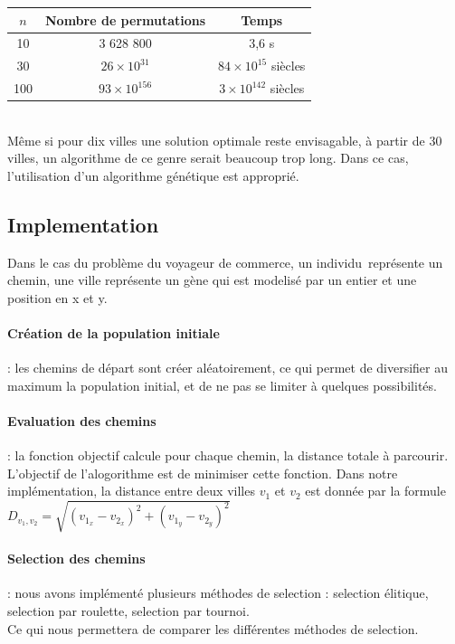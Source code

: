 \documentclass{article}
\begin{document}
	\begin{tabular}{ccc}
	\hline
	$n$ & Nombre de permutations & Temps \\
	\hline
	10 & 3 628 800 & 3,6 s\\
	30 & $26 \times 10^{31}$ & $84 \times 10^{15}$ siècles \\
	100 & $93 \times 10^{156}$ & $3 \times 10^{142}$ siècles \\
	\hline
	\end{tabular}
	\\
    Même si pour dix villes une solution optimale reste envisagable, à partir de 30 villes, un algorithme de ce genre serait beaucoup trop long.
	Dans ce cas, l'utilisation d'un algorithme génétique est approprié.

    \subsection{Implementation}

    Dans le cas du problème du voyageur de commerce, un individu représente un chemin, une ville représente un gène qui est modelisé par un entier et une position en x et y.

    \paragraph{Création de la population initiale}: les chemins de départ sont créer aléatoirement, ce qui permet de diversifier au maximum la population initial, et de ne pas se limiter à quelques possibilités.

    \paragraph{Evaluation des chemins}: la fonction objectif calcule pour chaque chemin, la distance totale à parcourir. L'objectif de l'alogorithme est de minimiser cette fonction. Dans notre implémentation, la distance entre deux villes $v_1$ et $v_2$ est donnée par la formule $D_{v_1, v_2} = \sqrt{(v_{1_x}-v_{2_x})^2 + (v_{1_y}-v_{2_y})^2}$

    \paragraph{Selection des chemins}: nous avons implémenté plusieurs méthodes de selection : selection élitique,  selection par roulette, selection par tournoi. \\
    Ce qui nous permettera de comparer les différentes méthodes de selection.
\end{document}
